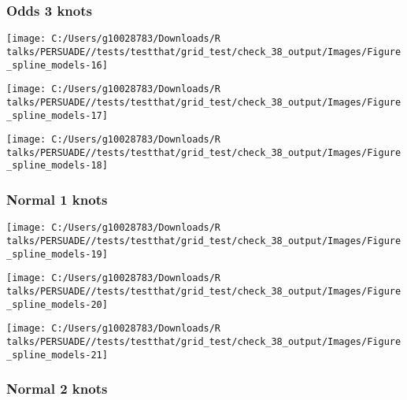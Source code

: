 \documentclass[
]{article}
\begin{document}
\clearpage

\subsubsection{Odds 3 knots}\label{odds-3-knots}

\begin{flushleft}\texttt{[image: C:/Users/g10028783/Downloads/R talks/PERSUADE//tests/testthat/grid\_test/check\_38\_output/Images/Figure\_spline\_models-16]} \end{flushleft}

\begin{flushleft}\texttt{[image: C:/Users/g10028783/Downloads/R talks/PERSUADE//tests/testthat/grid\_test/check\_38\_output/Images/Figure\_spline\_models-17]} \end{flushleft}

\begin{flushleft}\texttt{[image: C:/Users/g10028783/Downloads/R talks/PERSUADE//tests/testthat/grid\_test/check\_38\_output/Images/Figure\_spline\_models-18]} \end{flushleft}

\clearpage

\subsubsection{Normal 1 knots}\label{normal-1-knots}

\begin{flushleft}\texttt{[image: C:/Users/g10028783/Downloads/R talks/PERSUADE//tests/testthat/grid\_test/check\_38\_output/Images/Figure\_spline\_models-19]} \end{flushleft}

\begin{flushleft}\texttt{[image: C:/Users/g10028783/Downloads/R talks/PERSUADE//tests/testthat/grid\_test/check\_38\_output/Images/Figure\_spline\_models-20]} \end{flushleft}

\begin{flushleft}\texttt{[image: C:/Users/g10028783/Downloads/R talks/PERSUADE//tests/testthat/grid\_test/check\_38\_output/Images/Figure\_spline\_models-21]} \end{flushleft}

\clearpage

\subsubsection{Normal 2 knots}\label{normal-2-knots}
\end{document}
